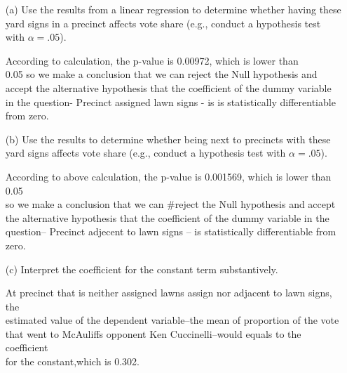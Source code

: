 \documentclass[12pt,letterpaper]{article}
\begin{document}
\vspace{.5cm}
\begin{enumerate}
	\item [(a)] Use the results from a linear regression to determine whether having these yard signs in a precinct affects vote share (e.g., conduct a hypothesis test with $\alpha = .05$).
			\vspace{5cm}
				 
				
					\begin{itemize}
					According to calculation, the p-value is 0.00972, which is lower than \\
					0.05 so we make a conclusion that we can reject the Null hypothesis and \\
					accept the alternative hypothesis that the coefficient of the dummy variable \\
					in the question- Precinct assigned lawn signs - is is statistically differentiable \\
					from zero.\\
				\end{itemize}
	\newpage		
	\item [(b)]  Use the results to determine whether being
	next to precincts with these yard signs affects vote
	share (e.g., conduct a hypothesis test with $\alpha = .05$).
					 
					\begin{itemize}
                  According to above calculation, the p-value is 0.001569, which is lower than 0.05\\
                   so we make a conclusion that we can #reject the Null hypothesis and accept\\
                    the alternative hypothesis that the coefficient of the dummy variable in the \\
                    question-- Precinct adjecent to lawn signs -- is statistically differentiable from\\
                     zero.\\
					\end{itemize}
	\vspace{7cm}
	\item [(c)] Interpret the coefficient for the constant term substantively.
	\vspace{2 cm}
	\begin{itemize}
		At precinct that is neither assigned lawns assign nor adjacent to lawn signs, the \\
		estimated value of the dependent variable--the mean of proportion of the vote \\
		that went to McAuliffs opponent Ken Cuccinelli--would equals to the coefficient\\
		 for the constant,which is 0.302.\\
		\end{itemize}
	\vspace{7cm}


\end{enumerate}
\end{document}
